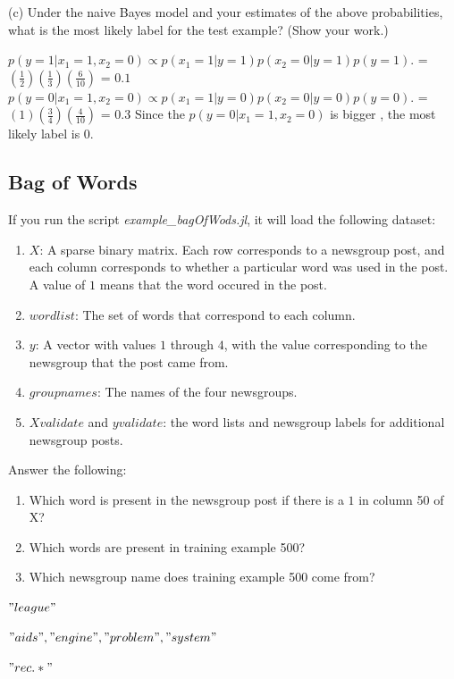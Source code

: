 \documentclass{article}
\def\blu#1{{\color{blu}#1}}
\def\red#1{{\color{red}#1}}
\def\enum#1{\begin{enumerate}#1\end{enumerate}}
\begin{document}
\blu{(c) Under the naive Bayes model and your estimates of the above probabilities, what is the most likely label for the test example? (Show your work.)}



$p( y = 1 |  x_1 = 1 , x_2 = 0 ) \propto p(  x_1 = 1  | y = 1 ) p(  x_2 = 0  | y = 1 ) p( y =1)$.
        \newline =$ (\frac{1}{2}) (\frac{1}{3})(\frac{6}{10}) $
               \newline = $0.1$
\newline  
$p( y = 0 |  x_1 = 1 , x_2 = 0 ) \propto p(  x_1 = 1  | y = 0 ) p(  x_2 = 0  | y = 0 ) p( y =0)$.
        \newline =$ (1) (\frac{3}{4})(\frac{4}{10}) $
               \newline = $0.3$
\newline 
Since the $p( y = 0 |  x_1 = 1 , x_2 = 0 ) $ is bigger , the most likely label is 0.


\subsection{Bag of Words}

If you run the script \emph{example\_bagOfWods.jl}, it will load the following dataset:
\enum{
\item $X$: A sparse binary matrix. Each row corresponds to a newsgroup post, and each column corresponds to whether a particular word was used in the post. A value of $1$ means that the word occured in the post.
\item $wordlist$: The set of words that correspond to each column.
\item $y$: A vector with values $1$ through $4$, with the value corresponding to the newsgroup that the post came from.
\item $groupnames$: The names of the four newsgroups.
\item $Xvalidate$ and $yvalidate$: the word lists and newsgroup labels for additional newsgroup posts.
}
\blu{Answer the following}:
\enum{
\item Which word is present in the newsgroup post if there is a $1$ in column 50 of X?
\item Which words are present in training example 500?
\item Which newsgroup name does training example 500 come from?
}

\begin{enumerate}
\red{
\item  $"league"$
\item  $"aids","engine","problem","system"$
\item $"rec.*"$
}

\end{enumerate}
\end{document}
